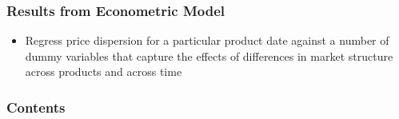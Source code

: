 \documentclass{beamer}
\begin{document}
\begin{frame}
\frametitle{Results from Econometric Model}
\begin{itemize}
\item Regress price dispersion for a particular product date against a number of dummy variables that capture the effects of differences in market structure across products and across time
\end{itemize}
\end{frame}



\begin{frame}[plain]
\frametitle{Contents}
\tableofcontents[hideallsubsections]
\end{frame}
\end{document}
